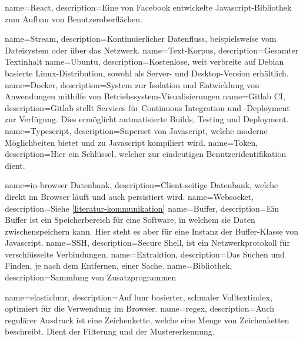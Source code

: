 {
    name=React,
    description={Eine von Facebook entwickelte Javascript-Bibliothek zum Aufbau von Benutzeroberflächen.}
}

{
    name=Stream,
    description={Kontinuierlicher Datenfluss, beispielsweise vom Dateisystem oder über das Netzwerk.}
}
{
    name=Text-Korpus,
    description={Gesamter Textinhalt}
}
{
    name=Ubuntu,
    description={Kostenlose, weit verbreite auf Debian basierte Linux-Dis\-tri\-bu\-tion, sowohl als Server- und Desktop-Version erhältlich.}
}
{
    name=Docker,
    description={System zur Isolation und Entwicklung von Anwendungen mithilfe von Betriebssystem-Visualisierungen}
}
{
    name=Gitlab CI,
    description={Gitlab stellt Services für Continuous Integration und -De\-ploy\-ment zur Verfügung. Dies ermöglicht autmatisierte Builds, Testing und Deployment.}
}
{
    name=Typescript,
    description={Superset von Javascript, welche moderne Möglichbeiten bietet und zu Javascript kompiliert wird.}
}
{
    name=Token,
    description={Hier ein Schlüssel, welcher zur eindeutigen Benutzeridentifikation dient.}
}

{
    name=in-browser Datenbank,
    description={Client-seitige Datenbank, welche direkt im Browser läuft und auch persistiert wird.}
}
{
    name=Websocket,
    description={Siehe \autoref{literatur-kommunikation}}
}
{
    name=Buffer,
    description={Ein Buffer ist ein Speicherbereich für eine Software, in welchem sie Daten zwischenspeichern kann. Hier steht es aber für eine Instanz der Buffer-Klasse von Javascript.}
}
{
    name=SSH,
    description={Secure Shell, ist ein Netzwerkprotokoll für verschlüsselte Verbindungen.}
}
{
    name=Extraktion,
    description={Das Suchen und Finden, je nach dem Entfernen, einer Sache.}
}
{
    name=Bibliothek,
    description={Sammlung von Zusatzprogrammen}
}

{
    name=elasticlunr,
    description={Auf lunr basierter, schmaler Volltextindex, optimiert für die Verwendung im Browser.}
}
{
    name=regex,
    description={Auch regulärer Ausdruck ist eine Zeichenkette, welche eine Menge von Zeichenketten beschreibt. Dient der Filterung und der Mustererkennung.}
}

